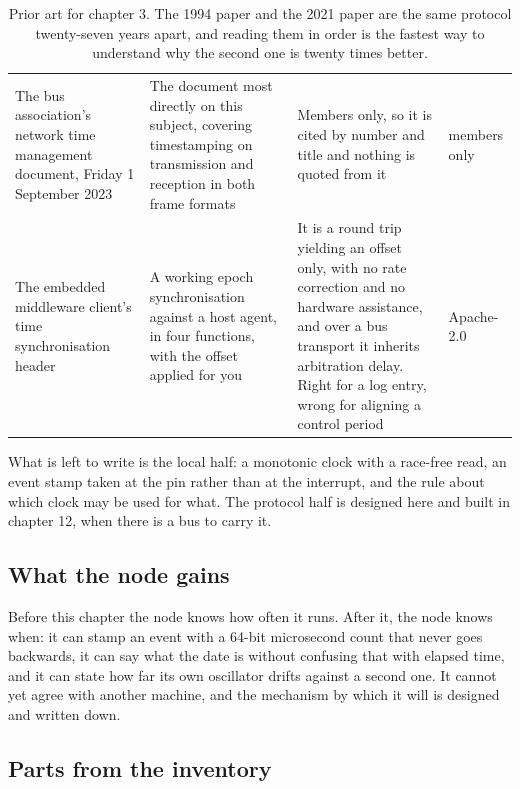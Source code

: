 \begin{table}[H]
\begin{tabular}{p{34mm}p{46mm}p{38mm}p{20mm}}
The bus association's network time management document, Friday 1 September 2023 & The document most directly on this subject, covering timestamping on transmission and reception in both frame formats & Members only, so it is cited by number and title and nothing is quoted from it & members only \\
The embedded middleware client's time synchronisation header & A working epoch synchronisation against a host agent, in four functions, with the offset applied for you & It is a round trip yielding an offset only, with no rate correction and no hardware assistance, and over a bus transport it inherits arbitration delay. Right for a log entry, wrong for aligning a control period & Apache-2.0 \\
\bottomrule
\end{tabular}
\caption{Prior art for chapter 3. The 1994 paper and the 2021 paper are the same protocol twenty-seven years apart, and reading them in order is the fastest way to understand why the second one is twenty times better.}
\end{table}

What is left to write is the local half: a monotonic clock with a race-free
read, an event stamp taken at the pin rather than at the interrupt, and the rule
about which clock may be used for what. The protocol half is designed here and
built in chapter 12, when there is a bus to carry it.

\subsection*{What the node gains}

Before this chapter the node knows how often it runs. After it, the node knows
when: it can stamp an event with a 64-bit microsecond count that never goes
backwards, it can say what the date is without confusing that with elapsed time,
and it can state how far its own oscillator drifts against a second one. It
cannot yet agree with another machine, and the mechanism by which it will is
designed and written down.

\subsection*{Parts from the inventory}

